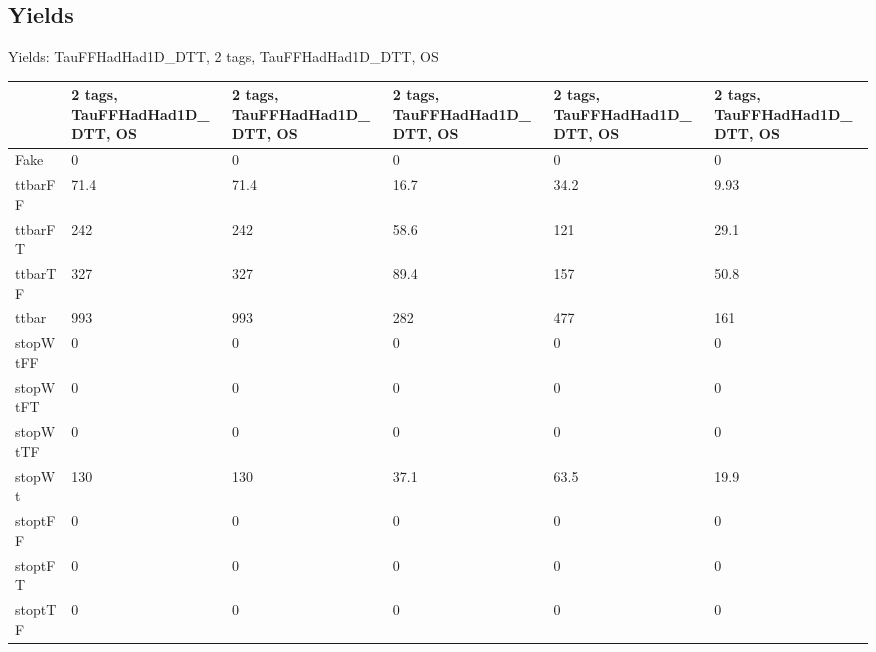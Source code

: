 
\subsection{Yields}

\begin{frame}{Yields: TauFFHadHad1D\_DTT, 2 tags, TauFFHadHad1D\_DTT, OS}
\begin{center}
  \begin{tabular}{l| >{\centering\let\newline\\\arraybackslash\hspace{0pt}}m{1.4cm}| >{\centering\let\newline\\\arraybackslash\hspace{0pt}}m{1.4cm}| >{\centering\let\newline\\\arraybackslash\hspace{0pt}}m{1.4cm}| >{\centering\let\newline\\\arraybackslash\hspace{0pt}}m{1.4cm}| >{\centering\let\newline\\\arraybackslash\hspace{0pt}}m{1.4cm}}
    & 2 tags, TauFFHadHad1D\_DTT, OS & 2 tags, TauFFHadHad1D\_DTT, OS & 2 tags, TauFFHadHad1D\_DTT, OS & 2 tags, TauFFHadHad1D\_DTT, OS & 2 tags, TauFFHadHad1D\_DTT, OS \\
 \hline \hline
    Fake& 0 & 0 & 0 & 0 & 0 \\
 \hline
    ttbarFF& 71.4 & 71.4 & 16.7 & 34.2 & 9.93 \\
 \hline
    ttbarFT& 242 & 242 & 58.6 & 121 & 29.1 \\
 \hline
    ttbarTF& 327 & 327 & 89.4 & 157 & 50.8 \\
 \hline
    ttbar& 993 & 993 & 282 & 477 & 161 \\
 \hline
    stopWtFF& 0 & 0 & 0 & 0 & 0 \\
 \hline
    stopWtFT& 0 & 0 & 0 & 0 & 0 \\
 \hline
    stopWtTF& 0 & 0 & 0 & 0 & 0 \\
 \hline
    stopWt& 130 & 130 & 37.1 & 63.5 & 19.9 \\
 \hline
    stoptFF& 0 & 0 & 0 & 0 & 0 \\
 \hline
    stoptFT& 0 & 0 & 0 & 0 & 0 \\
 \hline
    stoptTF& 0 & 0 & 0 & 0 & 0 \\

\end{tabular}
\end{center}
\end{frame}
